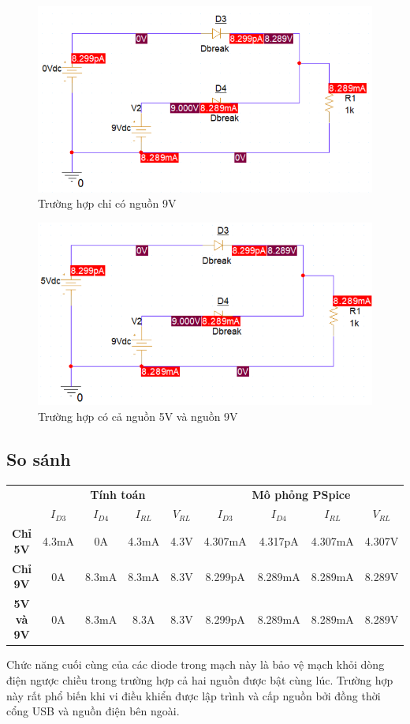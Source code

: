 \begin{figure}[H]
    \centering
    \includegraphics[width=1\textwidth]{graphics/ex5/f3.png}
    \caption{Trường hợp chỉ có nguồn 9V}
\end{figure}

\begin{figure}[H]
    \centering
    \includegraphics[width=1\textwidth]{graphics/ex5/f4.png}
    \caption{Trường hợp có cả nguồn 5V và nguồn 9V}
\end{figure}

\subsection{So sánh}
\begin{table}[H]
    \centering
    \begin{tabular}{|c|c|c|c|c|c|c|c|c|}
        \cline{2-9}
        \multicolumn{1}{c|}{} & \multicolumn{4}{c|}{\textbf{Tính toán}} & \multicolumn{4}{c|}{\textbf{Mô phỏng PSpice}} \\ \cline{2-9}
        \multicolumn{1}{c|}{} & \(I_{D3}\) & \(I_{D4}\) & \(I_{RL}\) & \(V_{RL}\) & \(I_{D3}\) & \(I_{D4}\) & \(I_{RL}\) & \(V_{RL}\) \\ \hline
        \textbf{Chỉ 5V} & 4.3mA & 0A & 4.3mA & 4.3V & 4.307mA & 4.317pA & 4.307mA & 4.307V \\ \hline
        \textbf{Chỉ 9V} & 0A & 8.3mA & 8.3mA & 8.3V & 8.299pA & 8.289mA & 8.289mA & 8.289V \\ \hline
        \textbf{5V và 9V} & 0A & 8.3mA & 8.3A & 8.3V & 8.299pA & 8.289mA & 8.289mA & 8.289V \\ \hline
    \end{tabular}
\end{table}

Chức năng cuối cùng của các diode trong mạch này là bảo vệ mạch khỏi dòng điện ngược chiều trong trường hợp cả hai nguồn được bật cùng lúc. Trường hợp này rất phổ biến khi vi điều khiển được lập trình và cấp nguồn bởi đồng thời cổng USB và nguồn điện bên ngoài.